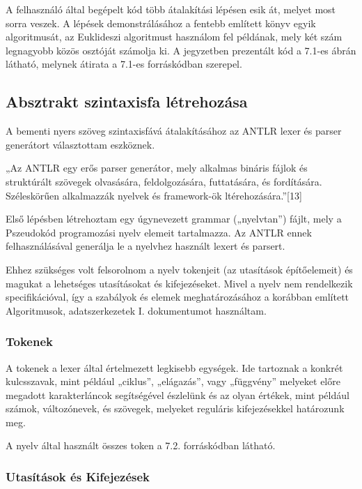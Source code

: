 A felhasználó által begépelt kód több átalakítási lépésen esik át, melyet most sorra veszek. A lépések demonstrálásához a fentebb említett könyv egyik algoritmusát, az Euklideszi algoritmust használom fel példának, mely két szám legnagyobb közös osztóját számolja ki. A jegyzetben prezentált kód a 7.1-es ábrán látható, melynek átirata a 7.1-es forráskódban szerepel.

\subsection{Absztrakt szintaxisfa létrehozása}

A bementi nyers szöveg szintaxisfává átalakításához az ANTLR lexer és parser generátort választottam eszköznek.

„Az ANTLR egy erős parser generátor, mely alkalmas bináris fájlok és struktúrált szövegek olvasására, feldolgozására, futtatására, és fordítására. Széleskörűen alkalmazzák nyelvek és framework-ök ltérehozására.”[13]

Első lépésben létrehoztam egy úgynevezett grammar („nyelvtan”) fájlt, mely a Pszeudokód programozási nyelv elemeit tartalmazza. Az ANTLR ennek felhasználásával generálja le a nyelvhez használt lexert és parsert.

Ehhez szükséges volt felsorolnom a nyelv tokenjeit (az utasítások építőelemeit) és magukat a lehetséges utasításokat és kifejezéseket. Mivel a nyelv nem rendelkezik specifikációval, így a szabályok és elemek meghatározásához a korábban említett Algoritmusok, adatszerkezetek I. dokumentumot használtam.

\subsubsection{Tokenek}

A tokenek a lexer által értelmezett legkisebb egységek. Ide tartoznak a konkrét kulcsszavak, mint például „ciklus”, „elágazás”, vagy „függvény” melyeket előre megadott karakterláncok segítségével észlelünk és az olyan értékek, mint például számok, változónevek, és szövegek, melyeket reguláris kifejezésekkel határozunk meg.

A nyelv által használt összes token a 7.2. forráskódban látható.

\subsubsection{Utasítások és Kifejezések}

